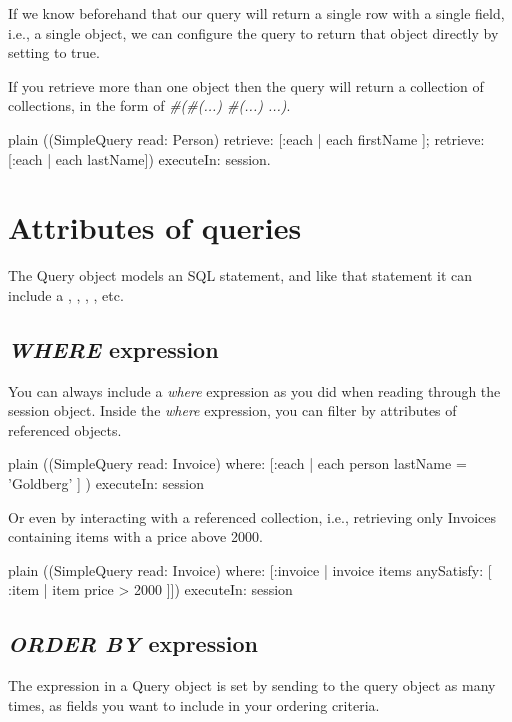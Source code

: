 \documentclass[10pt,twoside,english]{_support/latex/sbabook/sbabook}
\begin{document}
If we know beforehand that our query will return a single row with a single
field, i.e., a single object, we can configure the query to return that
object directly by setting  to true.

If you retrieve more than one object then the query will return a collection
of collections, in the form of \textit{\#(\#(...) \#(...) ...)}.

\begin{displaycode}{plain}
((SimpleQuery read: Person)
	retrieve: [:each | each firstName ];
	retrieve: [:each | each lastName]) executeIn: session.
\end{displaycode}
\section{Attributes of queries}
The Query object models an SQL  statement, and like that statement
it can include a , , , , etc.
\subsection{\textit{WHERE} expression}
You can always include a \textit{where} expression as you did when reading through the session object. Inside the \textit{where} expression, you can filter by attributes of referenced objects.

\begin{displaycode}{plain}
((SimpleQuery read: Invoice)
	where: [:each | each person lastName = 'Goldberg' ]
	) executeIn: session
\end{displaycode}

Or even by interacting with a referenced collection, i.e., retrieving only Invoices containing items with a price above 2000.

\begin{displaycode}{plain}
((SimpleQuery read: Invoice)
	where: [:invoice |
		invoice items anySatisfy: [ :item |
			item price > 2000 ]]) executeIn: session
\end{displaycode}
\subsection{\textit{ORDER BY} expression}
The  expression in a Query object is set by sending  to
the query object as many times, as fields you want to include in your ordering
criteria.
\end{document}
